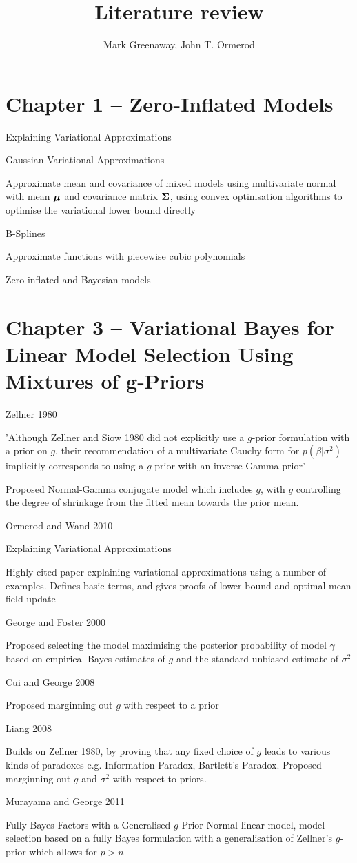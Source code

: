 \documentclass{amsart}[12pt]
\title{Literature review}
\author{Mark Greenaway, John T. Ormerod}
\begin{document}
\maketitle

\section{Chapter 1 -- Zero-Inflated Models}

Explaining Variational Approximations

Gaussian Variational Approximations

Approximate mean and covariance of mixed models using multivariate normal with mean ${\boldsymbol \mu}$ and covariance
matrix ${\boldsymbol \Sigma}$, using convex optimsation algorithms to optimise the variational lower bound directly

B-Splines

Approximate functions with piecewise cubic polynomials

Zero-inflated and Bayesian models

\section{Chapter 3 -- Variational Bayes for Linear Model Selection Using Mixtures of g-Priors}

Zellner 1980

'Although Zellner and Siow 1980 did not explicitly use a $g$-prior formulation with a prior on $g$,
their recommendation of a multivariate Cauchy form for $p(\beta|\sigma^2)$ implicitly corresponds to using a
$g$-prior with an inverse Gamma prior'

Proposed Normal-Gamma conjugate model which includes $g$, with $g$ controlling the degree of shrinkage
from the fitted mean towards the prior mean.

Ormerod and Wand 2010

Explaining Variational Approximations

Highly cited paper explaining variational approximations using a number of examples.
Defines basic terms, and gives proofs of lower bound and optimal mean field update

George and Foster 2000

Proposed selecting the model maximising the posterior probability of model $\gamma$ based on empirical
Bayes estimates of $g$ and the standard unbiased estimate of $\sigma^2$

Cui and George 2008

Proposed marginning out $g$ with respect to a prior

Liang 2008

Builds on Zellner 1980, by proving that any fixed choice of $g$ leads to various kinds of paradoxes e.g.
Information Paradox, Bartlett's Paradox.
Proposed marginning out $g$ and $\sigma^2$ with respect to priors.

Murayama and George 2011

Fully Bayes Factors with a Generalised $g$-Prior
Normal linear model, model selection based on a fully Bayes formulation with a generalisation of Zellner's
$g$-prior which allows for $p > n$
\end{document}
